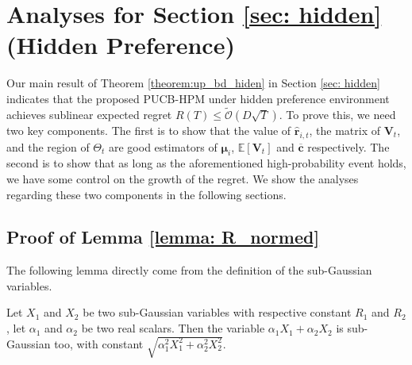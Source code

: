 \section{Analyses for Section \ref{sec: hidden} (Hidden Preference) }

Our main result of Theorem \ref{theorem:up_bd_hiden} in Section \ref{sec: hidden} indicates that the proposed PUCB-HPM under hidden preference environment achieves sublinear expected regret $R(T) \leq \tilde{\mathcal{O}}(D \sqrt{T})$. 
To prove this, we need two key components. 
The first is to show that the value of $\hat{\boldsymbol{r}}_{i,t}$, the matrix of $\boldsymbol{V}_t$, and the region of $\Theta_{t}$ are good estimators of $\boldsymbol{\mu}_i$, $\mathbb{E}[\boldsymbol{V}_t]$ and $\overline{\boldsymbol{c}}$ respectively.
The second is to show that as long as the aforementioned high-probability event holds, we have some control on the growth of the regret.
We show the analyses regarding these two components in the following sections.

\subsection{Proof of Lemma \ref{lemma: R_normed}}
The following lemma directly come from the definition of the sub-Gaussian variables.

\begin{lemma}
\label{lemma: sub_gaussian_addity}
Let $X_1$ and $X_2$ be two sub-Gaussian variables with respective constant $R_1$ and $R_2$, let $\alpha_1$ and $\alpha_2$ be two real scalars. Then the variable $\alpha_1 X_1 + \alpha_2 X_2$ is sub-Gaussian too, with constant $\sqrt{\alpha_1^2 X_1^2 + \alpha_2^2 X_2^2}$.
\end{lemma}

